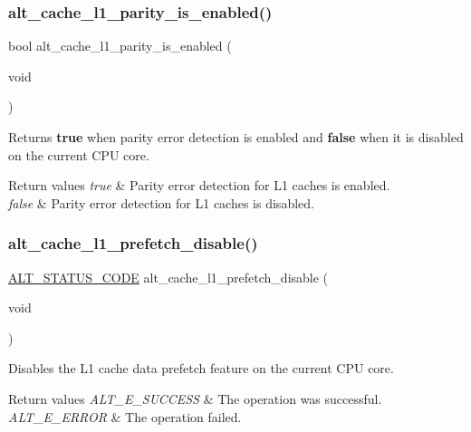 \subsubsection{\texorpdfstring{alt\_cache\_l1\_parity\_is\_enabled()}{alt\_cache\_l1\_parity\_is\_enabled()}}
{\footnotesize\ttfamily bool alt\+\_\+cache\+\_\+l1\+\_\+parity\+\_\+is\+\_\+enabled (\begin{DoxyParamCaption}\item[{void}]{ }\end{DoxyParamCaption})}

Returns {\bfseries{true}} when parity error detection is enabled and {\bfseries{false}} when it is disabled on the current C\+PU core.


\begin{DoxyRetVals}{Return values}
{\em true} & Parity error detection for L1 caches is enabled. \\
\hline
{\em false} & Parity error detection for L1 caches is disabled. \\
\hline
\end{DoxyRetVals}
\mbox{\label{group__CACHE__L1_ga00810e67920610f7da017ff65a5c9c2c}} 
\subsubsection{\texorpdfstring{alt\_cache\_l1\_prefetch\_disable()}{alt\_cache\_l1\_prefetch\_disable()}}
{\footnotesize\ttfamily \mbox{\hyperlink{hwlib_8h_abdb0d369f069723ca55d6c94bcaaaa12}{A\+L\+T\+\_\+\+S\+T\+A\+T\+U\+S\+\_\+\+C\+O\+DE}} alt\+\_\+cache\+\_\+l1\+\_\+prefetch\+\_\+disable (\begin{DoxyParamCaption}\item[{void}]{ }\end{DoxyParamCaption})}

Disables the L1 cache data prefetch feature on the current C\+PU core.


\begin{DoxyRetVals}{Return values}
{\em A\+L\+T\+\_\+\+E\+\_\+\+S\+U\+C\+C\+E\+SS} & The operation was successful. \\
\hline
{\em A\+L\+T\+\_\+\+E\+\_\+\+E\+R\+R\+OR} & The operation failed. \\
\hline
\end{DoxyRetVals}
\mbox{\label{group__CACHE__L1_ga796ec973ccc04f01e496485fed4aa59b}} 
